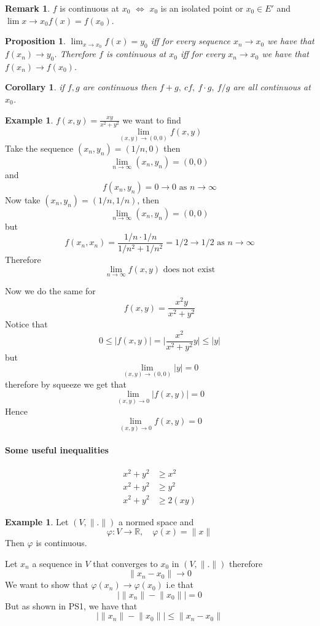 \documentclass[11pt,a4paper]{article}
\theoremstyle{definition}
\newtheorem{example}[definition]{Example}
\newtheorem{remark}[definition]{Remark}
\theoremstyle{plain}
\newtheorem{proposition}[definition]{Proposition}
\newtheorem{corollary}[definition]{Corollary}
\theoremstyle{remark}
\newcommand{\R}{\mathbb{R}}
\newcommand{\abs}[1]{\lvert #1 \rvert}
\newcommand{\norm}[1]{\lVert #1 \rVert}
\begin{document}
\begin{remark}
    $f$ is continuous at $x_0$ $\iff$ $x_0$ is an isolated point or $x_0 \in E'$ and $\lim{x \to x_0} f(x) = f(x_0)$. 
\end{remark}


\begin{proposition}
    $\lim_{x \to x_0} f(x) = y_0$ iff for every sequence $x_n \to x_0$ we have that $f(x_n) \to y_0$.
    Therefore $f$ is continuous at $x_0$ iff for every $x_n \to x_0$ we have that $f(x_n) \to f(x_0)$. 
\end{proposition}

\begin{corollary}
    if $f, g$ are continuous then $f + g, \ cf, \ f \cdot g, \ f / g$ are all continuous at $x_0$.
\end{corollary}

\begin{example}
    $f(x, y) = \frac{xy}{x^2 + y^2}$ we want to find 
    $$\lim_{(x,y) \to (0,0)} f(x,y)$$
    Take the sequence $(x_n, y_n) = (1/n, 0)$ then 
    $$\lim_{n \to \infty} (x_n, y_n) = (0,0)$$
    and 
    $$f(x_n, y_n) = 0 \to 0 \text{ as $n \to \infty$}$$
    Now take $(x_n, y_n) = (1/n, 1/n)$, then 
    $$\lim_{n \to \infty} (x_n, y_n) = (0,0)$$
    but 
    $$f(x_n, x_n) = \frac{1/n \cdot 1/n}{1/n^2 + 1/n^2} = 1/2 \to 1/2 \text{ as $n \to \infty$}$$ 
    Therefore 
    $$\lim_{n \to \infty} f(x, y) \text{ does not exist}$$

    Now we do the same for 
    $$f(x,y) = \frac{x^2 y}{x^2 + y^2}$$
    Notice that 
    $$0 \le \abs{f(x,y)} = \abs{\frac{x^2}{x^2 + y^2} y} \le |y|$$
    but 
    $$\lim_{(x,y) \to (0,0)} |y| = 0$$
    therefore by squeeze we get that 
    $$\lim_{(x,y) \to 0} |f(x,y)| = 0$$
    Hence 
    $$\lim_{(x, y) \to 0} f(x,y) = 0$$
\end{example}

\paragraph{Some useful inequalities} 
\begin{align*}
    x^2 + y^2 &\ge x^2 \\
    x^2 + y^2 &\ge y^2 \\
    x^2 + y^2 &\ge 2(xy)
\end{align*}

\begin{example}
    Let $(V, \norm{.})$ a normed space and 
    $$\varphi \colon V \to \R, \quad \varphi(x) = \norm{x}$$
    Then $\varphi$ is continuous. 
    
    Let $x_n$ a sequence in $V$ that converges to $x_0$ in $(V, \norm{.})$ therefore 
    $$\norm{x_n - x_0} \to 0$$
    We want to show that $\varphi(x_n) \to \varphi(x_0)$ i.e that 
    $$|\norm{x_n} - \norm{x_0}| = 0$$
    But as shown in PS1, we have that 
    $$\abs{\norm{x_n} - \norm{x_0}} \le \norm{x_n - x_0}$$
\end{example}
\end{document}
